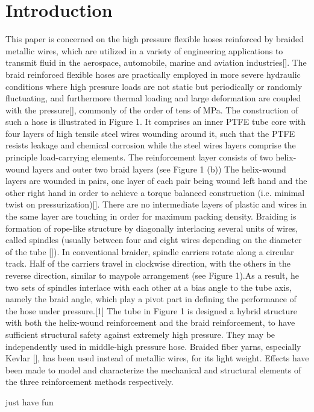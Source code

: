 \section{Introduction}
\label{introduction}




This paper is concerned on the high pressure flexible hoses reinforced by braided metallic wires, which are utilized in a variety of engineering applications to transmit fluid in the aerospace, automobile, marine and aviation industries[]. The braid reinforced flexible hoses are practically employed in more severe hydraulic conditions where high pressure loads are not static but periodically or randomly fluctuating, and furthermore thermal loading and large deformation are coupled with the pressure[], commonly of the order of tens of MPa. 
The construction of such a hose is illustrated in Figure 1. It comprises an inner PTFE tube core with four layers of high tensile steel wires wounding around it, such that the PTFE resists leakage and chemical corrosion while the steel wires layers comprise the principle load-carrying elements. The reinforcement layer consists of two helix-wound layers and outer two braid layers (see Figure 1 (b))
The helix-wound layers are wounded in pairs, one layer of each pair being wound left hand and the other right hand in order to achieve a torque balanced construction (i.e. minimal twist on pressurization)[]. There are no intermediate layers of plastic and wires in the same layer are touching in order for maximum packing density.
Braiding is formation of rope-like structure by diagonally interlacing several units of wires, called spindles (usually between four and eight wires depending on the diameter of the tube []). 
In conventional braider, spindle carriers rotate along a circular track. Half of the carriers travel in clockwise direction, with the others in the reverse direction, similar to maypole arrangement (see Figure 1).As a result, he two sets of spindles interlace with each other at a bias angle to the tube axis, namely the braid angle, which play a pivot part in defining the performance of the hose under pressure.[1]
The tube in Figure 1 is designed a hybrid structure with both the helix-wound reinforcement and the braid reinforcement, to have sufficient structural safety against extremely high pressure. They may be independently used in middle-high pressure hose. Braided fiber yarns, especially Kevlar [], has been used instead of metallic wires, for its light weight. Effects have been made to model and characterize the mechanical and structural elements of the three reinforcement methods respectively.

just have fun



